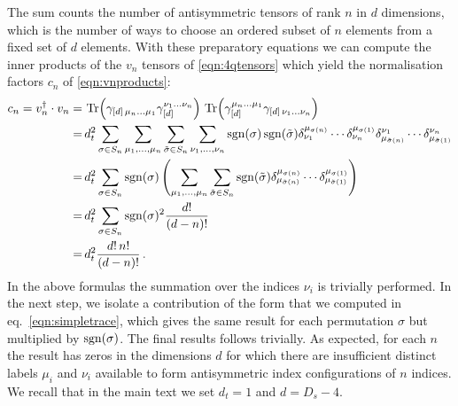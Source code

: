 The sum counts the number of antisymmetric tensors of
rank $n$ in $d$ dimensions, which is the number of ways to 
choose an ordered subset of $n$ elements from a fixed set of $d$
elements.
%
With these preparatory equations we can
compute the inner products of the $v_n$ tensors of 
\cref{eqn:4qtensors}
which yield the normalisation factors $c_n$
of \cref{eqn:vnproducts}:
\begin{align}
  \begin{split}
    \label{eq:cnCalc}
    c_n=v_n^\dagger\cdot v_n =&\,
%
    \Tr(\gamma_{[d]\,\mu_n \ldots \mu_1} \gamma_{[d]}^
    {\nu_1 \ldots \nu_n}) \,
%
    \Tr(\gamma_{[d]}^{\mu_n \ldots \mu_1} \gamma_{
    [d]\,\nu_1 \ldots \nu_n}) \\
    =&\,
    d_t^2 \sum_{\sigma\in  S_n} 
    \sum_{\mu_1,\ldots,\mu_n}
    \sum_{\tilde \sigma\in S_n}
    \sum_{\nu_1,\ldots,\nu_n}
%
    \sgn(\sigma)
    \sgn(\tilde\sigma)
    \delta^{\mu_{\sigma(n)}}_{\nu_1}\cdots\delta^{\mu_{\sigma(1)}}_{\nu_n}
    \delta_{\mu_{\tilde\sigma(n)}}^{\nu_1}\cdots
    \delta_{\mu_{\tilde\sigma(1)}}^{\nu_n}
    \\
%
    =&\,d_t^2 \sum_{\sigma\in  S_n} 
    \sgn(\sigma)
    \left(
    \sum_{\mu_1,\ldots,\mu_n}\sum_{\tilde \sigma\in S_n}
%
    \sgn(\tilde\sigma)
    \delta^{\mu_{\sigma(n)}}_{\mu_{\tilde\sigma(n)}}
    \cdots
    \delta^{\mu_{\sigma(1)}}_{\mu_{\tilde\sigma(1)}}
    \right)
    \\
%
    =&\, d_t^2 \sum_{\sigma\in  S_n} 
    \sgn(\sigma)^2 \frac{d!}{(d-n)!}\\
    =&\, d_t^2 \frac{d!\,n!}{(d-n)!}\,.
  \end{split}
\end{align}
In the above formulas the summation over the indices $\nu_i$ is 
trivially performed. In the next step, we isolate a contribution
of the form that we computed in eq.~\eqref{eqn:simpletrace},
which gives the same result for each permutation $\sigma$ but
multiplied by $\operatorname{sgn}(\sigma)$. The final results follows
trivially.
As expected, for each $n$ the result has zeros in the dimensions
$d$ for which there are insufficient distinct labels 
$\mu_i$ and $\nu_i$ available to form antisymmetric index 
configurations of $n$ indices.
We recall that in the main text we set $d_t=1$ and $d=D_s-4$.


